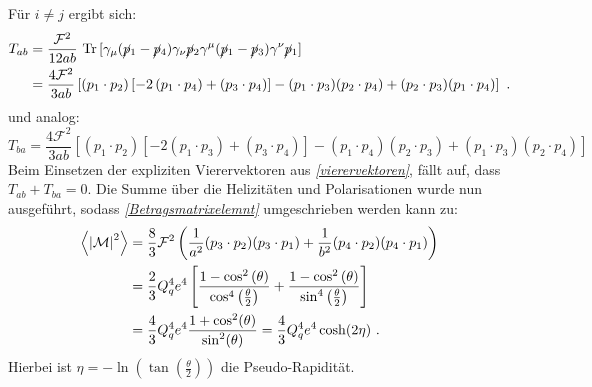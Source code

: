 Für $i \neq j$ ergibt sich:
\begin{equation}
\begin{aligned}
T_{ab} &= \frac{\mathcal{F}^2}{12ab}~\text{Tr}\left[\gamma_\mu(\cancel{p}_1- \cancel{p}_4)  \gamma_\nu \cancel{p}_2 \gamma^\mu (\cancel{p}_1- \cancel{p}_3)  \gamma^\nu \cancel{p}_1 \right] \\
&=  \frac{4\mathcal{F}^2}{3ab} \left[\left( p_1\cdot p_2\right) \left[ -2 \left( p_1 \cdot p_4 \right) + \left(p_3 \cdot p_4\right)\right] - (p_1\cdot p_3)(p_2\cdot p_4) + (p_2\cdot p_3)(p_1\cdot p_4)\right]~.
\end{aligned}
\end{equation}
und analog:
\begin{equation}
T_{ba} = \frac{4\mathcal{F}^2}{3ab} \left[\left( p_1\cdot p_2\right) \left[ -2 \left( p_1 \cdot p_3 \right) + \left(p_3 \cdot p_4\right)\right] - (p_1\cdot p_4)(p_2\cdot p_3) + (p_1\cdot p_3)(p_2\cdot p_4)\right]
\end{equation}
Beim Einsetzen der expliziten Vierervektoren aus \textit{\autoref{vierervektoren}}, fällt auf, dass $T_{ab} + T_{ba} = 0$. Die Summe über die Helizitäten und Polarisationen wurde nun ausgeführt, sodass \textit{\autoref{Betragsmatrixelemnt}} umgeschrieben werden kann zu:
\begin{equation}
\begin{aligned}
\left\langle  \abs{\mathcal{M}}^2\right\rangle &= \frac{8}{3}\mathcal{F}^2 \left(\frac{1}{a^2}(p_3\cdot p_2)(p_3\cdot p_1) + \frac{1}{b^2} (p_4\cdot p_2)(p_4\cdot p_1) \right) \\
&= \frac{2}{3}Q_q^4e^4\left[\frac{1-\cos^2\left(\theta\right)}{\cos^4\left(\frac{\theta}{2}\right)} + \frac{1-\cos^2\left(\theta\right)}{\sin^4\left(\frac{\theta}{2}\right)}\right] \\
&=\frac{4}{3} Q_q^4e^4\frac{1+\cos^2(\theta)}{\sin^2(\theta)} = \frac{4}{3} Q_q^4e^4\cosh(2\eta)~.
\end{aligned}
\end{equation}
Hierbei ist  $\eta = -\ln\left(\tan\left(\frac{\theta}{2}\right)\right)$ die Pseudo-Rapidität.
